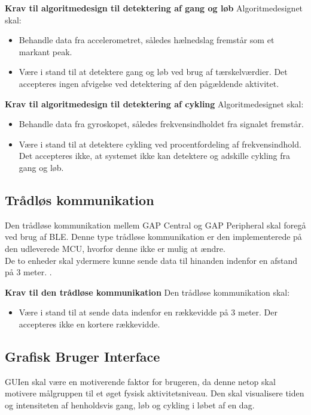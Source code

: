 \textbf{Krav til algoritmedesign til detektering af gang og løb} \newline 
Algoritmedesignet skal:
\begin{itemize}
	\item Behandle data fra accelerometret, således hælnedslag fremstår som et markant peak.
	\item Være i stand til at detektere gang og løb ved brug af tærskelværdier. Det accepteres ingen afvigelse ved detektering af den pågældende aktivitet.
\end{itemize}

\textbf{Krav til algoritmedesign til detektering af cykling} \newline 
Algoritmedesignet skal:
\begin{itemize}
	\item Behandle data fra gyroskopet, således frekvensindholdet fra signalet fremstår.
	\item Være i stand til at detektere cykling ved procentfordeling af frekvensindhold. Det accepteres ikke, at systemet ikke kan detektere og adskille cykling fra gang og løb.
\end{itemize}

\subsection{Trådløs kommunikation}\label{krav_BLE}
Den trådløse kommunikation mellem GAP Central og GAP Peripheral skal foregå ved brug af BLE. Denne type trådløse kommunikation er den implementerede på den udleverede MCU, hvorfor denne ikke er mulig at ændre.\\
De to enheder skal ydermere kunne sende data til hinanden indenfor en afstand på 3 meter. . 

\textbf{Krav til den trådløse kommunikation} \newline 
Den trådløse kommunikation skal:
\begin{itemize}
	\item Være i stand til at sende data indenfor en rækkevidde på 3 meter. Der accepteres ikke en kortere rækkevidde.
\end{itemize}

\subsection{Grafisk Bruger Interface}\label{krav_GUI}
GUIen skal være en motiverende faktor for brugeren, da denne netop skal motivere målgruppen til et øget fysisk aktivitetsniveau. Den skal visualisere tiden og intensiteten af henholdsvis gang, løb og cykling i løbet af en dag. %

